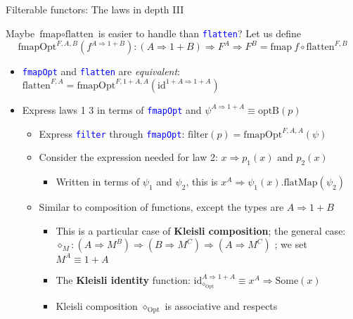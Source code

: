 \documentclass[english]{beamer}
\begin{document}
\begin{frame}{Filterable functors: The laws in depth III}

Maybe $\text{fmap}\circ\text{flatten}$ is easier to handle than \texttt{\textcolor{blue}{\footnotesize{}flatten}}?
Let us define {\footnotesize{}
\[
\text{fmapOpt}^{F,A,B}(f^{A\Rightarrow1+B}):\left(A\Rightarrow1+B\right)\Rightarrow F^{A}\Rightarrow F^{B}=\text{fmap}\:f\circ\text{flatten}^{F,B}
\]
}{\footnotesize \par}
\begin{itemize}
\item \texttt{\textcolor{blue}{\footnotesize{}fmapOpt}} and \texttt{\textcolor{blue}{\footnotesize{}flatten}}
are \emph{equivalent}: {\footnotesize{}$\text{flatten}^{F,A}=\text{fmapOpt}^{F,1+A,A}(\text{id}^{1+A\Rightarrow1+A})$ }{\footnotesize \par}
\item Express laws 1 \textendash{} 3 in terms of \texttt{\textcolor{blue}{\footnotesize{}fmapOpt}}
and {\footnotesize{}$\psi^{A\Rightarrow1+A}\equiv\text{optB}\left(p\right)$}{\footnotesize \par}
\begin{itemize}
\item Express \texttt{\textcolor{blue}{\footnotesize{}filter}} through \texttt{\textcolor{blue}{\footnotesize{}fmapOpt}}:
$\text{filter}\left(p\right)=\text{fmapOpt}^{F,A,A}\left(\psi\right)$
\item Consider the expression needed for law 2: $x\Rightarrow p_{1}(x)\text{ and }p_{2}(x)$
\begin{itemize}
\item Written in terms of $\psi_{1}$ and $\psi_{2}$, this is $x^{A}\Rightarrow\psi_{1}(x)\text{.flatMap}\left(\psi_{2}\right)$
\end{itemize}
\item Similar to composition of functions, except the types are $A\Rightarrow1+B$
\begin{itemize}
\item This is a particular case of \textbf{Kleisli composition}; the general
case: $\diamond_{M}:\left(A\Rightarrow M^{B}\right)\Rightarrow\left(B\Rightarrow M^{C}\right)\Rightarrow\left(A\Rightarrow M^{C}\right)$
; we set $M^{A}\equiv1+A$
\item The \textbf{Kleisli identity} function: $\text{id}_{\diamond_{\text{Opt}}}^{A\Rightarrow1+A}\equiv x^{A}\Rightarrow\text{Some}\left(x\right)$
\item Kleisli composition $\diamond_{\text{Opt}}$ is associative and respects

\end{itemize}
\end{itemize}
\end{itemize}
\end{frame}
\end{document}
